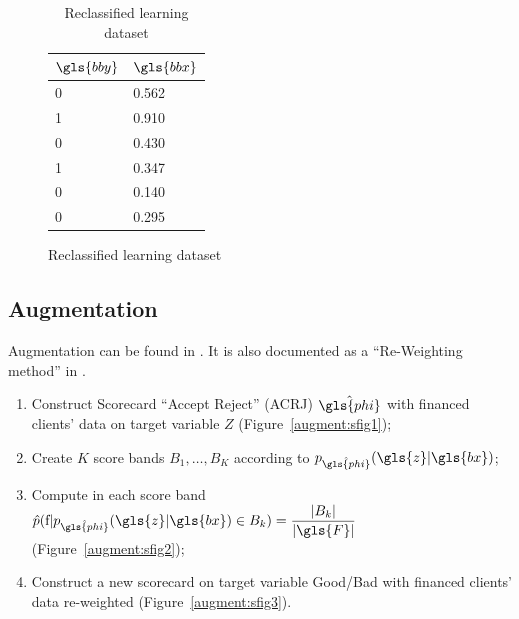 \begin{table}
{\begin{multicols}{3}
\begin{subfigure}[t]{0.31\textwidth}
\begin{center}
\begin{adjustbox}{max width=\textwidth}
\begin{tabular}{l l}
\toprule
\textbf{${\gls{bby}}$} & \textbf{${\gls{bbx}}$}\\
\midrule
0 & 0.562 \\
1 & 0.910 \\
0 & 0.430 \\
1 & 0.347 \\
0 & 0.140 \\
0 & 0.295 \\
\bottomrule
\end{tabular}
\end{adjustbox}
\end{center}
\caption{Reclassified learning dataset}
\label{reclass:sfig3}
\end{subfigure}

\end{multicols}
}
\end{table}


\subsection{Augmentation} \label{augmentation}

Augmentation can be found in \cite{RI6}. It is also documented as a ``Re-Weighting method'' in \cite{saporta,banasik,economix}.

\begin{enumerate}
\item Construct Scorecard ``Accept Reject'' (ACRJ) $\hat{\gls{phi}}$ with financed clients' data on target variable $Z$ (Figure~\ref{augment:sfig1});
\item Create $K$ score bands $B_1, \ldots, B_K$ according to $p_{\hat{\gls{phi}}}(\gls{z} | \gls{bx})$;
\item Compute in each score band $\hat{p}(\text{f}|p_{\hat{\gls{phi}}}(\gls{z} | \gls{bx}) \in B_k) = \dfrac{|B_k|}{|\gls{F}|}$ (Figure~\ref{augment:sfig2});
\item Construct a new scorecard on target variable Good/Bad with financed clients' data re-weighted (Figure~\ref{augment:sfig3}).
\end{enumerate}

